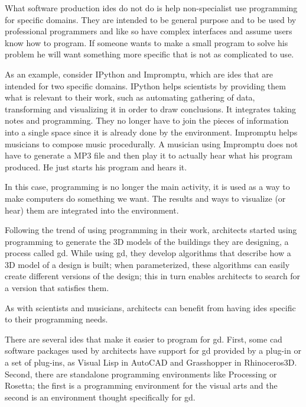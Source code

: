 \documentclass{./llncs2e/llncs}
\begin{document}
	What software production \acp{ide} do not do is help non-specialist use programming for specific domains.
	They are intended to be general purpose and to be used by professional programmers and like so have complex interfaces and assume users know how to program.
	If someone wants to make a small program to solve his problem he will want something more specific that is not as complicated to use.
	
	As an example, consider IPython and Impromptu, which are \acp{ide} that are intended for two specific domains.
	IPython helps scientists by providing them what is relevant to their work, such as automating gathering of data, transforming and visualizing it in order to draw conclusions.
	It integrates taking notes and programming.
	They no longer have to join the pieces of information into a single space since it is already done by the environment.
	Impromptu helps musicians to compose music procedurally.
	A musician using Impromptu does not have to generate a MP3 file and then play it to actually hear what his program produced.
	He just starts his program and hears it.

	In this case, programming is no longer the main activity, it is used as a way to make computers do something we want.
	The results and ways to visualize (or hear) them are integrated into the environment.

	Following the trend of using programming in their work, architects started using programming to generate the 3D models of the buildings they are designing, a process called \acf{gd}\cite{terzidis2003expressive,Maeda:2001:DN:559503}.
	While using \ac{gd}, they develop algorithms that describe how a 3D model of a design is built; when parameterized, these algorithms can easily create different versions of the design; this in turn enables architects to search for a version that satisfies them.
	
	As with scientists and musicians, architects can benefit from having \acp{ide} specific to their programming needs.

	There are several \acp{ide} that make it easier to program for \ac{gd}. 
	First, some \ac{cad} software packages used by architects have support for \ac{gd} provided by a plug-in or a set of plug-ins, as Visual Lisp in AutoCAD and Grasshopper in Rhinoceros3D.
	Second, there are standalone programming environments like Processing\cite{reas2007processing} or Rosetta\cite{de2012modern}; the first is a programming environment for the visual arts and the second is an environment thought specifically for \ac{gd}.
	
\end{document}
